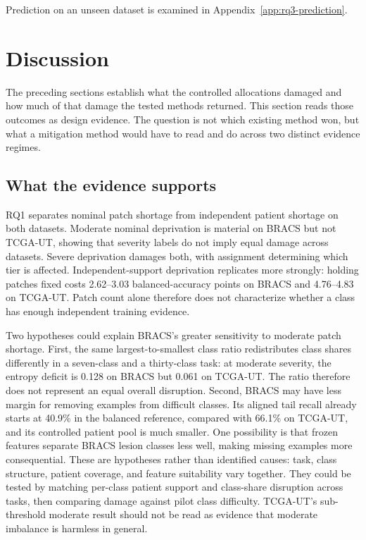 \documentclass[11pt]{article}
\begin{document}
Prediction on an unseen dataset is examined in Appendix~\ref{app:rq3-prediction}.

\section{Discussion}
\label{sec:discussion}
The preceding sections establish what the controlled allocations damaged and how much of that damage the tested methods returned. This section reads those outcomes as design evidence. The question is not which existing method won, but what a mitigation method would have to read and do across two distinct evidence regimes.

\subsection{What the evidence supports}
\label{sec:discussion-evidence}
RQ1 separates nominal patch shortage from independent patient shortage on both datasets. Moderate nominal deprivation is material on BRACS but not TCGA-UT, showing that severity labels do not imply equal damage across datasets. Severe deprivation damages both, with assignment determining which tier is affected. Independent-support deprivation replicates more strongly: holding patches fixed costs \num{2.62}--\num{3.03} balanced-accuracy points on BRACS and \num{4.76}--\num{4.83} on TCGA-UT. Patch count alone therefore does not characterize whether a class has enough independent training evidence.

Two hypotheses could explain BRACS's greater sensitivity to moderate patch shortage. First, the same largest-to-smallest class ratio redistributes class shares differently in a seven-class and a thirty-class task: at moderate severity, the entropy deficit is \num{0.128} on BRACS but \num{0.061} on TCGA-UT. The ratio therefore does not represent an equal overall disruption. Second, BRACS may have less margin for removing examples from difficult classes. Its aligned tail recall already starts at \num{40.9}\% in the balanced reference, compared with \num{66.1}\% on TCGA-UT, and its controlled patient pool is much smaller. One possibility is that frozen features separate BRACS lesion classes less well, making missing examples more consequential. These are hypotheses rather than identified causes: task, class structure, patient coverage, and feature suitability vary together. They could be tested by matching per-class patient support and class-share disruption across tasks, then comparing damage against pilot class difficulty. TCGA-UT's sub-threshold moderate result should not be read as evidence that moderate imbalance is harmless in general.
\end{document}
